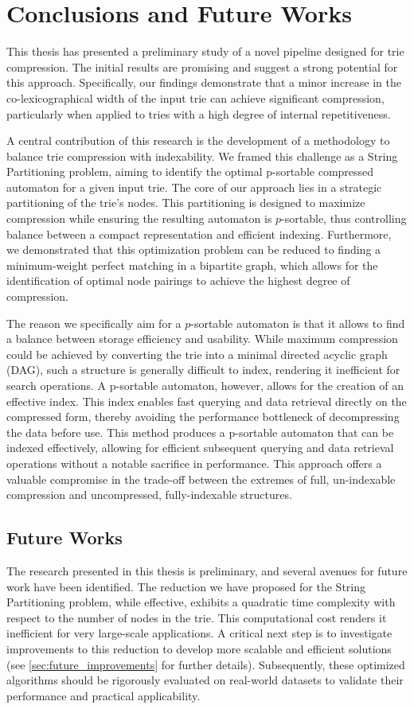 \chapter{Conclusions and Future Works}
This thesis has presented a preliminary study of a novel pipeline designed for trie compression. The initial results are promising and suggest a strong potential for this approach. Specifically, our findings demonstrate that a minor increase in the co-lexicographical width of the input trie can achieve significant compression, particularly when applied to tries with a high degree of internal repetitiveness.

A central contribution of this research is the development of a methodology to balance trie compression with indexability. We framed this challenge as a String Partitioning problem, aiming to identify the optimal p-sortable compressed automaton for a given input trie. The core of our approach lies in a strategic partitioning of the trie's nodes. This partitioning is designed to maximize compression while ensuring the resulting automaton is $p$-sortable, thus controlling balance between a compact representation and efficient indexing. Furthermore, we demonstrated that this optimization problem can be reduced to finding a minimum-weight perfect matching in a bipartite graph, which allows for the identification of optimal node pairings to achieve the highest degree of compression.

The reason we specifically aim for a $p$-sortable automaton is that it allows to find a balance between storage efficiency and usability. While maximum compression could be achieved by converting the trie into a minimal directed acyclic graph (DAG), such a structure is generally difficult to index, rendering it inefficient for search operations. A p-sortable automaton, however, allows for the creation of an effective index. This index enables fast querying and data retrieval directly on the compressed form, thereby avoiding the performance bottleneck of decompressing the data before use. This method produces a p-sortable automaton that can be indexed effectively, allowing for efficient subsequent querying and data retrieval operations without a notable sacrifice in performance. This approach offers a valuable compromise in the trade-off between the extremes of full, un-indexable compression and uncompressed, fully-indexable structures.

\section{Future Works}
The research presented in this thesis is preliminary, and several avenues for future work have been identified. The reduction we have proposed for the String Partitioning problem, while effective, exhibits a quadratic time complexity with respect to the number of nodes in the trie. This computational cost renders it inefficient for very large-scale applications. A critical next step is to investigate improvements to this reduction to develop more scalable and efficient solutions (see \cref{sec:future_improvements} for further details). Subsequently, these optimized algorithms should be rigorously evaluated on real-world datasets to validate their performance and practical applicability.

